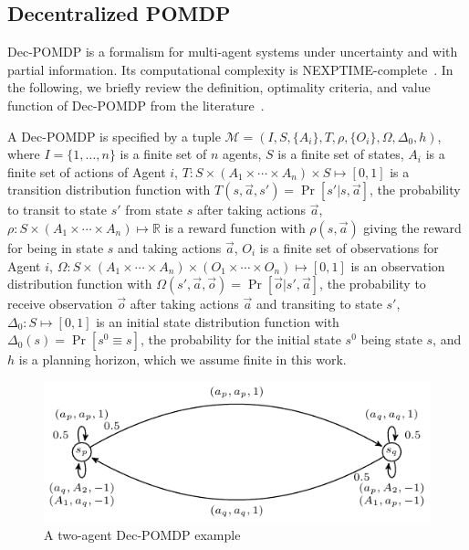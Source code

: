 \subsection{Decentralized POMDP}
\label{sect:dssat-dec-pomdp}
Dec-POMDP is a formalism for multi-agent systems under uncertainty and with partial information.
Its computational complexity is NEXPTIME-complete~\cite{Bernstein2002}.
In the following, we briefly review the definition, optimality criteria,
and value function of Dec-POMDP from the literature~\cite{Oliehoek2016}.

A Dec-POMDP is specified by a tuple $\mathcal{M}=(I,S,\{A_i\},T,\rho,\{O_i\},\Omega,\Delta_0,h)$, where
$I=\{1,\ldots,n\}$ is a finite set of $n$ agents,
$S$ is a finite set of states,
$A_i$ is a finite set of actions of Agent $i$,
$T:S\times(A_1\times\cdots\times A_n)\times S\mapsto [0,1]$ is a transition distribution function with
$T(s,\Vec{a},s')=\Pr[s'|s,\vec{a}]$,
the probability to transit to state $s'$ from state $s$ after taking actions $\vec{a}$,
$\rho:S\times(A_1\times\cdots\times A_n)\mapsto\mathbb{R}$ is a reward function with
$\rho(s,\vec{a})$ giving the reward for being in state $s$ and taking actions $\vec{a}$,
$O_i$ is a finite set of observations for Agent $i$,
$\Omega:S\times(A_1\times\cdots\times A_n)\times(O_1\times\cdots\times O_n)\mapsto[0,1]$ is an observation distribution function with
$\Omega(s',\Vec{a},\vec{o})=\Pr[\vec{o}|s',\vec{a}]$,
the probability to receive observation $\vec{o}$ after taking actions $\vec{a}$ and transiting to state $s'$, $\Delta_0:S\mapsto [0,1]$ is an initial state distribution function with $\Delta_0(s)=\Pr[s^0 \equiv s]$,
the probability for the initial state $s^0$ being state $s$,
and $h$ is a planning horizon, which we assume finite in this work.

\begin{figure}[t]
    \centering
    \includegraphics[scale=1.5]{fig/build/dec-pomdp-example.pdf}
    \caption{A two-agent Dec-POMDP example}
    \label{fig:dssat-dec-pomdp-state-graph}
\end{figure}

